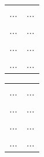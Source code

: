 
\begin{multicols}{2} 


\begin{tabular}{lp{4.5cm}} 
...        &    ... \\
...        &    ... \\
...        &    ... \\
...        &    ... \\
\end{tabular}
%
\begin{tabular}{lp{4.5cm}} 
...        &    ... \\
...        &    ... \\
...        &    ... \\
...        &    ... \\
\end{tabular}

 
\end{multicols} 